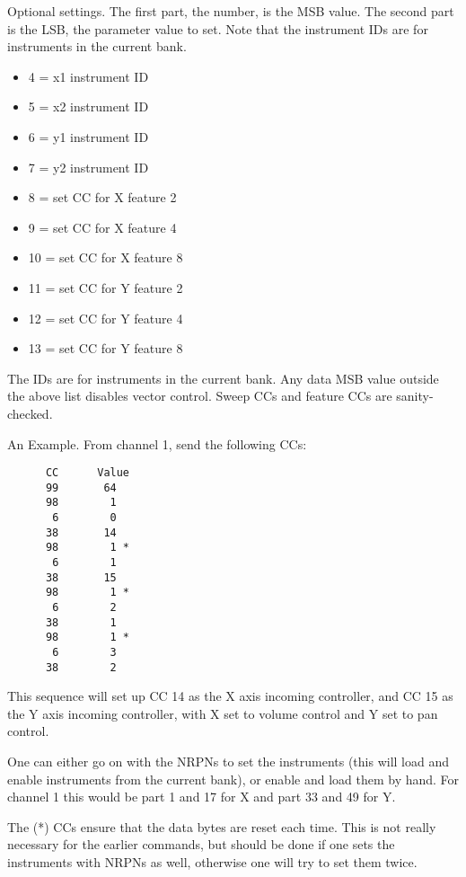    Optional settings.  The first part, the number, is the MSB value.
   The second part is the LSB, the parameter value to set.  Note that the
   instrument IDs are for instruments in the current bank.

   \begin{itemize}
      \item 4 = x1 instrument ID
      \item 5 = x2 instrument ID
      \item 6 = y1 instrument ID
      \item 7 = y2 instrument ID
      \item 8 = set CC for X feature 2
      \item 9 = set CC for X feature 4
      \item 10 = set CC for X feature 8
      \item 11 = set CC for Y feature 2
      \item 12 = set CC for Y feature 4
      \item 13 = set CC for Y feature 8
   \end{itemize}
              
   The IDs are for instruments in the current bank.
   Any data MSB value outside the above list disables vector control.
   Sweep CCs and feature CCs are sanity-checked.
    
   An Example. From channel 1, send the following CCs:

   \begin{verbatim}
      CC      Value
      99       64
      98        1
       6        0
      38       14
      98        1 *
       6        1
      38       15
      98        1 *
       6        2
      38        1
      98        1 *
       6        3
      38        2
   \end{verbatim}

   This sequence will set up CC 14 as the X axis incoming controller,
   and CC 15 as the Y axis incoming controller, with X set to volume control
   and Y set to pan control.

   One can either go on with the NRPNs to set the instruments (this will load
   and enable instruments from the current bank), or enable and load
   them by hand.  For channel 1 this would be part 1 and 17 for X and part 33
   and 49 for Y.

   The (*) CCs ensure that the data bytes are reset each time. This is not
   really necessary for the earlier commands, but should be done if one sets
   the instruments with NRPNs as well, otherwise one will try to set them
   twice.

